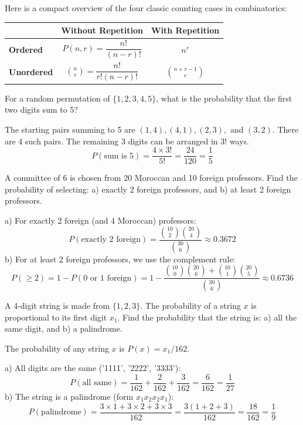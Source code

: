\begin{remark}
Here is a compact overview of the four classic counting cases in combinatorics:

\begin{table}[H]
\centering
\renewcommand{\arraystretch}{1.3} %
\setlength{\tabcolsep}{12pt} %
\begin{tabular}{lcc}
\toprule
 & \textbf{Without Repetition} & \textbf{With Repetition} \\
\midrule
\textbf{Ordered} & $P(n, r) = \dfrac{n!}{(n-r)!}$ & $n^r$ \\
\textbf{Unordered} & $\binom{n}{r} = \dfrac{n!}{r!(n-r)!}$ & $\binom{n+r-1}{r}$ \\
\bottomrule
\end{tabular}
\end{table}

\end{remark}

\begin{exercise}
    For a random permutation of $\{1,2,3,4,5\}$, what is the probability that the first two digits sum to 5?

    The starting pairs summing to 5 are $(1,4), (4,1), (2,3),$ and $(3,2)$. There are 4 such pairs. The remaining 3 digits can be arranged in $3!$ ways.
    $$ P(\text{sum is 5}) = \frac{4 \times 3!}{5!} = \frac{24}{120} = \frac{1}{5} $$
\end{exercise}

\begin{exercise}
    A committee of 6 is chosen from 20 Moroccan and 10 foreign professors. Find the probability of selecting: a) exactly 2 foreign professors, and b) at least 2 foreign professors.

    a) For exactly 2 foreign (and 4 Moroccan) professors:
    $$ P(\text{exactly 2 foreign}) = \frac{\binom{10}{2}\binom{20}{4}}{\binom{30}{6}} \approx 0.3672 $$
    b) For at least 2 foreign professors, we use the complement rule:
    $$ P(\ge 2) = 1 - P(0 \text{ or } 1 \text{ foreign}) = 1 - \frac{\binom{10}{0}\binom{20}{6} + \binom{10}{1}\binom{20}{5}}{\binom{30}{6}} \approx 0.6736 $$
\end{exercise}

\begin{exercise}
    A 4-digit string is made from $\{1,2,3\}$. The probability of a string $x$ is proportional to its first digit $x_1$. Find the probability that the string is: a) all the same digit, and b) a palindrome.

    The probability of any string $x$ is $P(x) = x_1/162$.
    
    a) All digits are the same ('1111', '2222', '3333'):
    $$ P(\text{all same}) = \frac{1}{162} + \frac{2}{162} + \frac{3}{162} = \frac{6}{162} = \frac{1}{27} $$
    b) The string is a palindrome (form $x_1x_2x_2x_1$):
    $$ P(\text{palindrome}) = \frac{3 \times 1 + 3 \times 2 + 3 \times 3}{162} = \frac{3(1+2+3)}{162} = \frac{18}{162} = \frac{1}{9} $$
\end{exercise}

